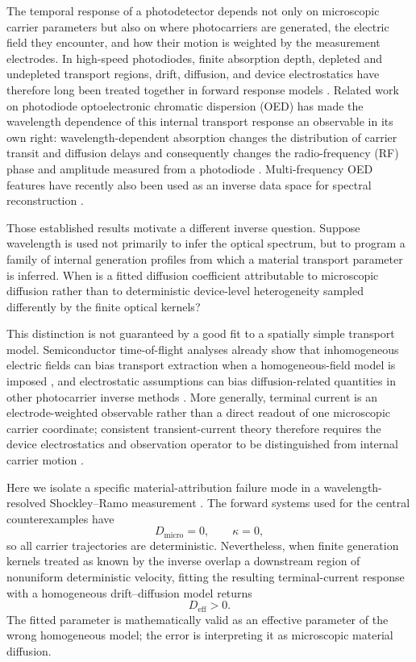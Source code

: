 \documentclass[aps,pra,twocolumn,superscriptaddress,nofootinbib]{revtex4-2}
\newcommand{\Deff}{D_{\mathrm{eff}}}
\newcommand{\Dmicro}{D_{\mathrm{micro}}}
\begin{document}
The temporal response of a photodetector depends not only on microscopic carrier parameters but also on where photocarriers are generated, the electric field they encounter, and how their motion is weighted by the measurement electrodes. In high-speed photodiodes, finite absorption depth, depleted and undepleted transport regions, drift, diffusion, and device electrostatics have therefore long been treated together in forward response models \cite{hu2015pda}. Related work on photodiode optoelectronic chromatic dispersion (OED) has made the wavelength dependence of this internal transport response an observable in its own right: wavelength-dependent absorption changes the distribution of carrier transit and diffusion delays and consequently changes the radio-frequency (RF) phase and amplitude measured from a photodiode \cite{glasser2021oed,liokumovitch2021germanium,liokumovitch2022femtometer,dutta2024pin,mudgal2024pn}. Multi-frequency OED features have recently also been used as an inverse data space for spectral reconstruction \cite{kassa2026spectroscopy}.

Those established results motivate a different inverse question. Suppose wavelength is used not primarily to infer the optical spectrum, but to program a family of internal generation profiles from which a material transport parameter is inferred. When is a fitted diffusion coefficient attributable to microscopic diffusion rather than to deterministic device-level heterogeneity sampled differently by the finite optical kernels?

This distinction is not guaranteed by a good fit to a spatially simple transport model. Semiconductor time-of-flight analyses already show that inhomogeneous electric fields can bias transport extraction when a homogeneous-field model is imposed \cite{emelianova2006tof}, and electrostatic assumptions can bias diffusion-related quantities in other photocarrier inverse methods \cite{hattori1992sspg}. More generally, terminal current is an electrode-weighted observable rather than a direct readout of one microscopic carrier coordinate; consistent transient-current theory therefore requires the device electrostatics and observation operator to be distinguished from internal carrier motion \cite{hawks2015current}.

Here we isolate a specific material-attribution failure mode in a wavelength-resolved Shockley--Ramo measurement \cite{shockley1938,ramo1939}. The forward systems used for the central counterexamples have
\begin{equation}
\Dmicro=0,
\qquad
\kappa=0,
\end{equation}
so all carrier trajectories are deterministic. Nevertheless, when finite generation kernels treated as known by the inverse overlap a downstream region of nonuniform deterministic velocity, fitting the resulting terminal-current response with a homogeneous drift--diffusion model returns
\begin{equation}
\Deff>0.
\end{equation}
The fitted parameter is mathematically valid as an effective parameter of the wrong homogeneous model; the error is interpreting it as microscopic material diffusion.
\end{document}
